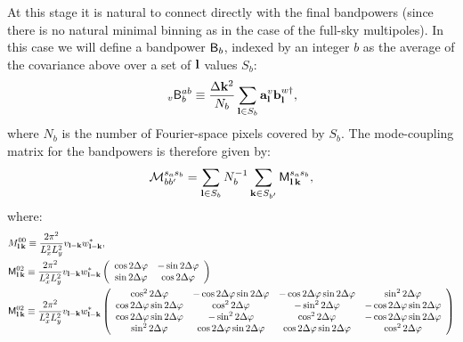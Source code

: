 \documentclass[a4paper,10pt]{article}
\begin{document}
    At this stage it is natural to connect directly with the final bandpowers (since there is no natural minimal binning as in the case of the full-sky multipoles). In this case we will define a bandpower ${\sf B}_b$, indexed by an integer $b$ as the average of the covariance above over a set of ${\bf l}$ values $S_b$:
    \begin{equation}
      \,_v{\sf B}^{ab}_b\equiv\frac{\Delta{\bf k}^2}{N_b}\sum_{{\bf l}\in S_b}{\bf a}^v_{\bf l}{\bf b}^{w\dag}_{\bf l},
    \end{equation}
    where $N_b$ is the number of Fourier-space pixels covered by $S_b$. The mode-coupling matrix for the bandpowers is therefore given by:
    \begin{equation}
      \mathcal{M}^{s_as_b}_{bb'}=\sum_{{\bf l}\in S_b}N_b^{-1}\sum_{{\bf k}\in S_{b'}}{\sf M}^{s_as_b}_{{\bf l}\,{\bf k}},
    \end{equation}
    where:
    \begin{align}
      & M^{00}_{{\bf l}\,{\bf k}}\equiv\frac{2\pi^2}{L_x^2L_y^2}v_{{\bf l}-{\bf k}}w^*_{{\bf l}-{\bf k}},\\
      & {\sf M}^{02}_{{\bf l}\,{\bf k}}\equiv\frac{2\pi^2}{L_x^2L_y^2}v_{{\bf l}-{\bf k}}w^*_{{\bf l}-{\bf k}}
      \left(
      \begin{array}{cc}
        \cos2\Delta\varphi & -\sin2\Delta\varphi \\
        \sin2\Delta\varphi & \cos2\Delta\varphi
      \end{array}
      \right)\\
      & {\sf M}^{02}_{{\bf l}\,{\bf k}}\equiv\frac{2\pi^2}{L_x^2L_y^2}v_{{\bf l}-{\bf k}}w^*_{{\bf l}-{\bf k}}
      \left(
      \begin{array}{cccc}
        \cos^22\Delta\varphi & -\cos2\Delta\varphi\sin2\Delta\varphi & -\cos2\Delta\varphi\sin2\Delta\varphi & \sin^22\Delta\varphi\\
        \cos2\Delta\varphi\sin2\Delta\varphi & \cos^22\Delta\varphi & -\sin^22\Delta\varphi & -\cos2\Delta\varphi\sin2\Delta\varphi\\
        \cos2\Delta\varphi\sin2\Delta\varphi & -\sin^22\Delta\varphi & \cos^22\Delta\varphi & -\cos2\Delta\varphi\sin2\Delta\varphi\\
        \sin^22\Delta\varphi &  \cos2\Delta\varphi\sin2\Delta\varphi & \cos2\Delta\varphi\sin2\Delta\varphi & \cos^22\Delta\varphi\\
      \end{array}
      \right)
    \end{align}
\end{document}
